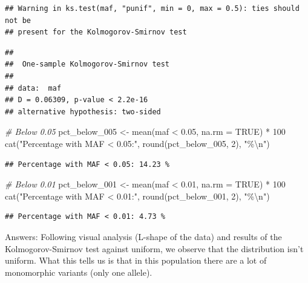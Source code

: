 \documentclass[
]{article}
\newenvironment{Shaded}{\begin{snugshade}}{\end{snugshade}}
\newcommand{\AttributeTok}[1]{\textcolor[rgb]{0.77,0.63,0.00}{#1}}
\newcommand{\CommentTok}[1]{\textcolor[rgb]{0.56,0.35,0.01}{\textit{#1}}}
\newcommand{\ConstantTok}[1]{\textcolor[rgb]{0.00,0.00,0.00}{#1}}
\newcommand{\DecValTok}[1]{\textcolor[rgb]{0.00,0.00,0.81}{#1}}
\newcommand{\FloatTok}[1]{\textcolor[rgb]{0.00,0.00,0.81}{#1}}
\newcommand{\FunctionTok}[1]{\textcolor[rgb]{0.00,0.00,0.00}{#1}}
\newcommand{\NormalTok}[1]{#1}
\newcommand{\OtherTok}[1]{\textcolor[rgb]{0.56,0.35,0.01}{#1}}
\newcommand{\SpecialCharTok}[1]{\textcolor[rgb]{0.00,0.00,0.00}{#1}}
\newcommand{\StringTok}[1]{\textcolor[rgb]{0.31,0.60,0.02}{#1}}
\begin{document}
\begin{verbatim}
## Warning in ks.test(maf, "punif", min = 0, max = 0.5): ties should not be
## present for the Kolmogorov-Smirnov test
\end{verbatim}

\begin{verbatim}
## 
##  One-sample Kolmogorov-Smirnov test
## 
## data:  maf
## D = 0.06309, p-value < 2.2e-16
## alternative hypothesis: two-sided
\end{verbatim}

\begin{Shaded}
\begin{Highlighting}[]
\CommentTok{\# Below 0.05}
\NormalTok{pct\_below\_005 }\OtherTok{\textless{}{-}} \FunctionTok{mean}\NormalTok{(maf }\SpecialCharTok{\textless{}} \FloatTok{0.05}\NormalTok{, }\AttributeTok{na.rm =} \ConstantTok{TRUE}\NormalTok{) }\SpecialCharTok{*} \DecValTok{100}
\FunctionTok{cat}\NormalTok{(}\StringTok{"Percentage with MAF \textless{} 0.05:"}\NormalTok{, }\FunctionTok{round}\NormalTok{(pct\_below\_005, }\DecValTok{2}\NormalTok{), }\StringTok{"\%}\SpecialCharTok{\textbackslash{}n}\StringTok{"}\NormalTok{)}
\end{Highlighting}
\end{Shaded}

\begin{verbatim}
## Percentage with MAF < 0.05: 14.23 %
\end{verbatim}

\begin{Shaded}
\begin{Highlighting}[]
\CommentTok{\# Below 0.01}
\NormalTok{pct\_below\_001 }\OtherTok{\textless{}{-}} \FunctionTok{mean}\NormalTok{(maf }\SpecialCharTok{\textless{}} \FloatTok{0.01}\NormalTok{, }\AttributeTok{na.rm =} \ConstantTok{TRUE}\NormalTok{) }\SpecialCharTok{*} \DecValTok{100}
\FunctionTok{cat}\NormalTok{(}\StringTok{"Percentage with MAF \textless{} 0.01:"}\NormalTok{, }\FunctionTok{round}\NormalTok{(pct\_below\_001, }\DecValTok{2}\NormalTok{), }\StringTok{"\%}\SpecialCharTok{\textbackslash{}n}\StringTok{"}\NormalTok{)}
\end{Highlighting}
\end{Shaded}

\begin{verbatim}
## Percentage with MAF < 0.01: 4.73 %
\end{verbatim}

Answers: Following visual analysis (L-shape of the data) and results of
the Kolmogorov-Smirnov test against uniform, we observe that the
distribution isn't uniform. What this tells us is that in this
population there are a lot of monomorphic variants (only one allele).
\end{document}
